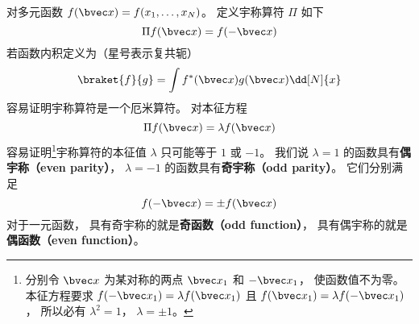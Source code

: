 

对多元函数 $f(\bvec x) = f(x_1, \dots, x_N)$。  定义宇称算符 $\Pi$ 如下
\begin{equation}
\Pi f(\bvec x) = f(-\bvec x)
\end{equation}
若函数内积定义为（星号表示复共轭）
\begin{equation}
\braket{f}{g} = \int f^*(\bvec x) g(\bvec x) \dd[N]{x}
\end{equation}
容易证明宇称算符是一个厄米算符。%
对本征方程
\begin{equation}
\Pi f(\bvec x) = \lambda f(\bvec x)
\end{equation}
容易证明\footnote{分别令 $\bvec x$ 为某对称的两点 $\bvec x_1$ 和 $-\bvec x_1$， 使函数值不为零。 本征方程要求 $f(-\bvec x_1) = \lambda f(\bvec x_1)$ 且 $f(\bvec x_1) = \lambda f(-\bvec x_1)$， 所以必有 $\lambda^2 = 1$， $\lambda = \pm 1$。}宇称算符的本征值 $\lambda$ 只可能等于 $1$ 或 $-1$。 我们说 $\lambda = 1$ 的函数具有\textbf{偶宇称（even parity）}， $\lambda = -1$ 的函数具有\textbf{奇宇称（odd parity）}。 它们分别满足
\begin{equation}
f(-\bvec x) = \pm f(\bvec x)
\end{equation}
对于一元函数， 具有奇宇称的就是\textbf{奇函数（odd function）}， 具有偶宇称的就是\textbf{偶函数（even function）}。
